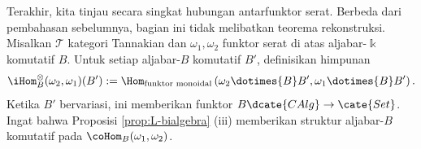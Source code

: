 Terakhir, kita tinjau secara singkat hubungan antarfunktor serat. Berbeda dari
pembahasan sebelumnya, bagian ini tidak melibatkan teorema rekonstruksi.
Misalkan $\mathcal{T}$ kategori Tannakian dan $\omega_1,\omega_2$ funktor serat
di atas aljabar-$\Bbbk$ komutatif $B$. Untuk setiap aljabar-$B$ komutatif
$B'$, definisikan himpunan
\begin{equation*}
	\iHom^\otimes_B(\omega_2, \omega_1)(B') := \Hom_{\text{funktor monoidal}}\left( \omega_2 \dotimes{B} B', \omega_1 \dotimes{B} B' \right).
\end{equation*}
Ketika $B'$ bervariasi, ini memberikan funktor $B\dcate{CAlg}\to\cate{Set}$. Ingat bahwa Proposisi \ref{prop:L-bialgebra} (iii) memberikan struktur aljabar-$B$ komutatif pada $\coHom_B(\omega_1,\omega_2)$.


